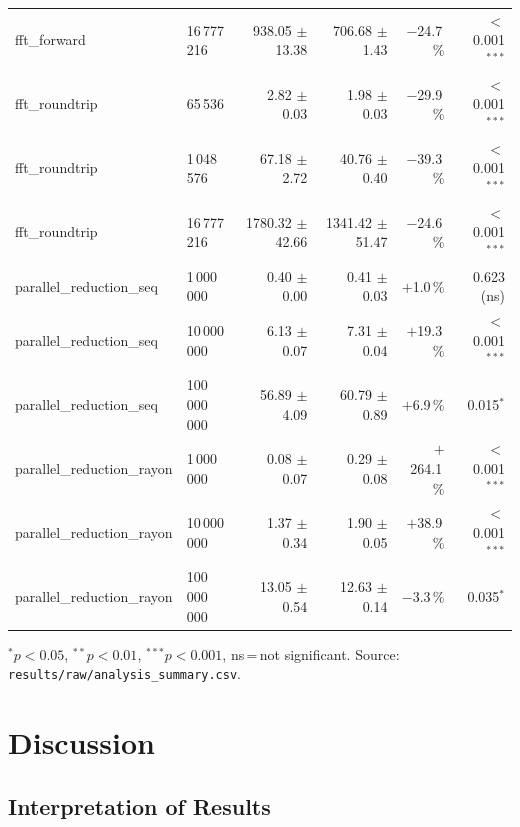 \documentclass{article}
\begin{document}
\begin{table}[htbp]
\begin{tabular}{llrrrr}
fft\_forward             & 16\,777\,216  & 938.05 $\pm$ 13.38 & 706.68 $\pm$ 1.43 & $-$24.7\,\% & $<$0.001$^{***}$ \\
fft\_roundtrip           & 65\,536       & 2.82 $\pm$ 0.03   & 1.98 $\pm$ 0.03   & $-$29.9\,\%  & $<$0.001$^{***}$ \\
fft\_roundtrip           & 1\,048\,576   & 67.18 $\pm$ 2.72  & 40.76 $\pm$ 0.40  & $-$39.3\,\%  & $<$0.001$^{***}$ \\
fft\_roundtrip           & 16\,777\,216  & 1780.32 $\pm$ 42.66 & 1341.42 $\pm$ 51.47 & $-$24.6\,\% & $<$0.001$^{***}$ \\
parallel\_reduction\_seq & 1\,000\,000   & 0.40 $\pm$ 0.00   & 0.41 $\pm$ 0.03   & $+$1.0\,\%   & 0.623 (ns) \\
parallel\_reduction\_seq & 10\,000\,000  & 6.13 $\pm$ 0.07   & 7.31 $\pm$ 0.04   & $+$19.3\,\%  & $<$0.001$^{***}$ \\
parallel\_reduction\_seq & 100\,000\,000 & 56.89 $\pm$ 4.09  & 60.79 $\pm$ 0.89  & $+$6.9\,\%   & 0.015$^{*}$ \\
parallel\_reduction\_rayon & 1\,000\,000   & 0.08 $\pm$ 0.07   & 0.29 $\pm$ 0.08   & $+$264.1\,\% & $<$0.001$^{***}$ \\
parallel\_reduction\_rayon & 10\,000\,000  & 1.37 $\pm$ 0.34   & 1.90 $\pm$ 0.05   & $+$38.9\,\%  & $<$0.001$^{***}$ \\
parallel\_reduction\_rayon & 100\,000\,000 & 13.05 $\pm$ 0.54  & 12.63 $\pm$ 0.14  & $-$3.3\,\%   & 0.035$^{*}$ \\
\bottomrule
\end{tabular}
{\small $^{*}p<0.05$, $^{**}p<0.01$, $^{***}p<0.001$,
 ns\,=\,not significant.
 Source: \texttt{results/raw/analysis\_summary.csv}.}
\end{table}

\section{Discussion}

\subsection{Interpretation of Results}
\end{document}
